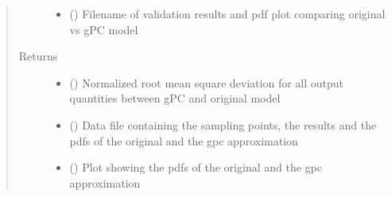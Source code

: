 \documentclass[letterpaper,10pt,english,openany,oneside]{sphinxmanual}
\begin{document}
\begin{fulllineitems}
\begin{quote}
\begin{description}
\begin{itemize}
\item {} 
 () \textendash{} Filename of validation results and pdf plot comparing original vs gPC model

\end{itemize}

\item[{Returns}] \leavevmode
\begin{itemize}
\item {} 
 () \textendash{} Normalized root mean square deviation for all output quantities between gPC and original model

\item {} 
 () \textendash{} Data file containing the sampling points, the results and the pdfs of the original and the gpc approximation

\item {} 
 () \textendash{} Plot showing the pdfs of the original and the gpc approximation

\end{itemize}


\end{description}\end{quote}

\end{fulllineitems}

\end{document}
